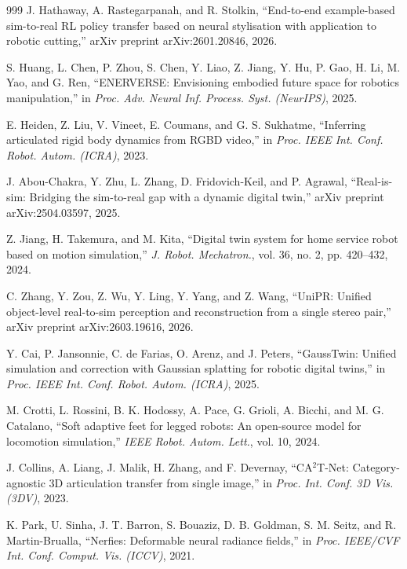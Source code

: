 ﻿\documentclass[11pt,a4paper]{article}
\begin{document}
\begin{thebibliography}{999}
J. Hathaway, A. Rastegarpanah, and R. Stolkin, ``End-to-end example-based sim-to-real {RL} policy transfer based on neural stylisation with application to robotic cutting,'' arXiv preprint arXiv:2601.20846, 2026.

S. Huang, L. Chen, P. Zhou, S. Chen, Y. Liao, Z. Jiang, Y. Hu, P. Gao, H. Li, M. Yao, and G. Ren, ``{ENERVERSE}: Envisioning embodied future space for robotics manipulation,'' in \textit{Proc. Adv. Neural Inf. Process. Syst. (NeurIPS)}, 2025.

E. Heiden, Z. Liu, V. Vineet, E. Coumans, and G. S. Sukhatme, ``Inferring articulated rigid body dynamics from RGBD video,'' in \textit{Proc. IEEE Int. Conf. Robot. Autom. (ICRA)}, 2023.

J. Abou-Chakra, Y. Zhu, L. Zhang, D. Fridovich-Keil, and P. Agrawal, ``Real-is-sim: Bridging the sim-to-real gap with a dynamic digital twin,'' arXiv preprint arXiv:2504.03597, 2025.

Z. Jiang, H. Takemura, and M. Kita, ``Digital twin system for home service robot based on motion simulation,'' \textit{J. Robot. Mechatron.}, vol. 36, no. 2, pp. 420--432, 2024.

C. Zhang, Y. Zou, Z. Wu, Y. Ling, Y. Yang, and Z. Wang, ``{UniPR}: Unified object-level real-to-sim perception and reconstruction from a single stereo pair,'' arXiv preprint arXiv:2603.19616, 2026.

Y. Cai, P. Jansonnie, C. de Farias, O. Arenz, and J. Peters, ``{GaussTwin}: Unified simulation and correction with Gaussian splatting for robotic digital twins,'' in \textit{Proc. IEEE Int. Conf. Robot. Autom. (ICRA)}, 2025.

M. Crotti, L. Rossini, B. K. Hodossy, A. Pace, G. Grioli, A. Bicchi, and M. G. Catalano, ``Soft adaptive feet for legged robots: An open-source model for locomotion simulation,'' \textit{IEEE Robot. Autom. Lett.}, vol. 10, 2024.

J. Collins, A. Liang, J. Malik, H. Zhang, and F. Devernay, ``{CA}$^2${T}-Net: Category-agnostic 3D articulation transfer from single image,'' in \textit{Proc. Int. Conf. 3D Vis. (3DV)}, 2023.

K. Park, U. Sinha, J. T. Barron, S. Bouaziz, D. B. Goldman, S. M. Seitz, and R. Martin-Brualla, ``Nerfies: Deformable neural radiance fields,'' in \textit{Proc. IEEE/CVF Int. Conf. Comput. Vis. (ICCV)}, 2021.


\end{thebibliography}
\end{document}
